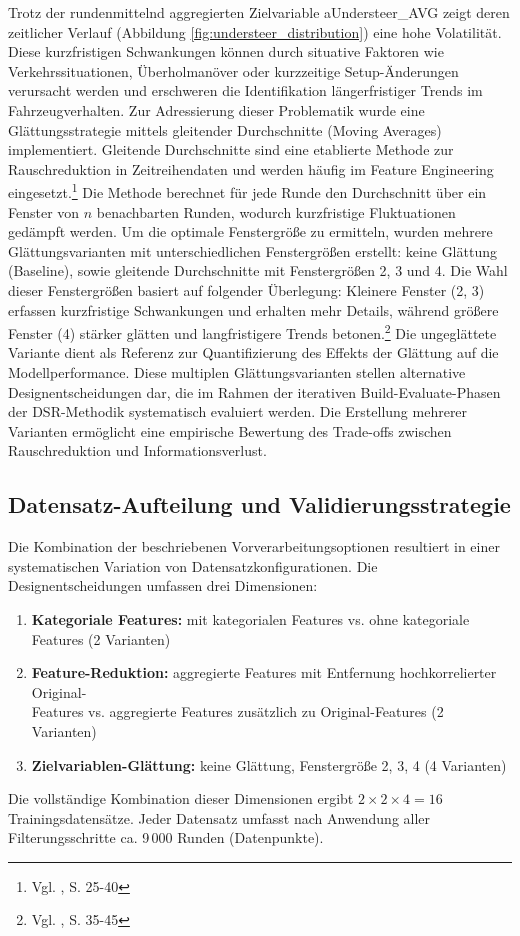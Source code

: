 Trotz der rundenmittelnd aggregierten Zielvariable aUndersteer\_AVG zeigt deren zeitlicher Verlauf (Abbildung \ref{fig:understeer_distribution}) eine hohe Volatilität. Diese kurzfristigen Schwankungen können durch situative Faktoren wie Verkehrssituationen, Überholmanöver oder kurzzeitige Setup-Änderungen verursacht werden und erschweren die Identifikation längerfristiger Trends im Fahrzeugverhalten.
Zur Adressierung dieser Problematik wurde eine Glättungsstrategie mittels gleitender Durchschnitte (Moving Averages) implementiert. Gleitende Durchschnitte sind eine etablierte Methode zur Rauschreduktion in Zeitreihendaten und werden häufig im Feature Engineering eingesetzt.\footnote{Vgl. \cite{Box2015}, S. 25-40} Die Methode berechnet für jede Runde den Durchschnitt über ein Fenster von $n$ benachbarten Runden, wodurch kurzfristige Fluktuationen gedämpft werden.
Um die optimale Fenstergröße zu ermitteln, wurden mehrere Glättungsvarianten mit unterschiedlichen Fenstergrößen erstellt: keine Glättung (Baseline), sowie gleitende Durchschnitte mit Fenstergrößen 2, 3 und 4.
Die Wahl dieser Fenstergrößen basiert auf folgender Überlegung: Kleinere Fenster (2, 3) erfassen kurzfristige Schwankungen und erhalten mehr Details, während größere Fenster (4) stärker glätten und langfristigere Trends betonen.\footnote{Vgl. \cite{Box2015}, S. 35-45} Die ungeglättete Variante dient als Referenz zur Quantifizierung des Effekts der Glättung auf die Modellperformance.
Diese multiplen Glättungsvarianten stellen alternative Designentscheidungen dar, die im Rahmen der iterativen Build-Evaluate-Phasen der DSR-Methodik systematisch evaluiert werden. Die Erstellung mehrerer Varianten ermöglicht eine empirische Bewertung des Trade-offs zwischen Rauschreduktion und Informationsverlust.


\subsection{Datensatz-Aufteilung und Validierungsstrategie}

Die Kombination der beschriebenen Vorverarbeitungsoptionen resultiert in einer systematischen Variation von Datensatzkonfigurationen. Die Designentscheidungen umfassen drei Dimensionen:

\begin{enumerate}
  \item \textbf{Kategoriale Features:} mit kategorialen Features vs. ohne kategoriale Features (2 Varianten)
  \item \textbf{Feature-Reduktion:} aggregierte Features mit Entfernung hochkorrelierter Original-\\Features vs. aggregierte Features zusätzlich zu Original-Features (2 Varianten)
  \item \textbf{Zielvariablen-Glättung:} keine Glättung, Fenstergröße 2, 3, 4 (4 Varianten)
\end{enumerate}
Die vollständige Kombination dieser Dimensionen ergibt $2 \times 2 \times 4 = 16$ Trainingsdatensätze. Jeder Datensatz umfasst nach Anwendung aller Filterungsschritte ca. 9\,000 Runden (Datenpunkte).

